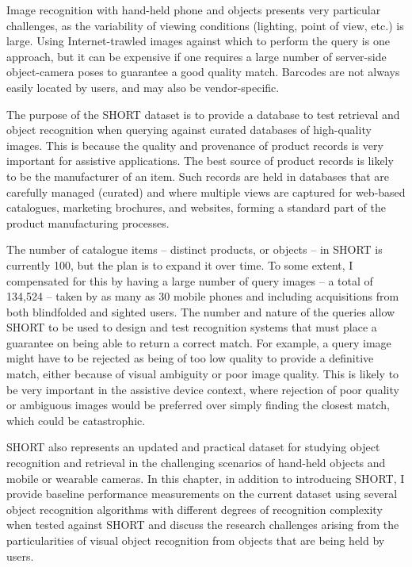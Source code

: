 Image recognition with hand-held phone and objects presents very particular challenges, as the variability of viewing conditions (lighting, point of view, etc.) is large. Using Internet-trawled images against which to perform the query is one approach, but it can be expensive if one requires a large number of server-side object-camera poses to guarantee a good quality match. Barcodes are not always easily located by users, and may also be vendor-specific. 


The purpose of the SHORT dataset is to provide a database to test retrieval and object recognition when querying against curated databases of high-quality images. This is because the quality and provenance of product records is very important for assistive applications. The best source of product records is likely to be the manufacturer of an item. Such records are held in databases that are carefully managed (curated) and where multiple views are captured for web-based catalogues, marketing brochures, and websites, forming a standard part of the product manufacturing processes.



The number of catalogue items -- distinct products, or objects -- in SHORT is currently 100, but the plan is to expand it over time. To some extent, I compensated for this by having a large number of query images -- a total of 134,524 -- taken by as many as 30 mobile phones and including acquisitions from both blindfolded and sighted users. The number and nature of the queries allow SHORT to be used to design and test recognition systems that must place a guarantee on being able to return a correct match. For example, a query image might have to be rejected as being of too low quality to provide a definitive match, either because of visual ambiguity or poor image quality. This is likely to be very important in the assistive device context, where rejection of poor quality or ambiguous images would be preferred over simply finding the closest match, which could be catastrophic.

SHORT also represents an updated and practical dataset for studying object recognition and retrieval in the challenging scenarios of hand-held objects and mobile or wearable cameras. In this chapter, in addition to introducing SHORT, I provide baseline performance measurements on the current dataset using several object recognition algorithms with different degrees of recognition complexity when tested against SHORT and discuss the research challenges arising from the particularities of visual object recognition from objects that are being held by users.


